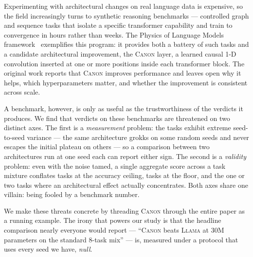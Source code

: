 \documentclass{article}
\newcommand{\Canon}{\textsc{Canon}\xspace}
\newcommand{\Llama}{\textsc{Llama}\xspace}
\begin{document}
Experimenting with architectural changes on real language data is expensive, so the field
increasingly turns to synthetic reasoning benchmarks --- controlled graph and sequence tasks
that isolate a specific transformer capability and train to convergence in hours rather than
weeks. The Physics of Language Models framework~\cite{allen_zhu_physics4} exemplifies this
program: it provides both a battery of such tasks and a candidate architectural improvement,
the \Canon layer, a learned causal 1-D convolution inserted at one or more positions inside
each transformer block. The original work reports that \Canon improves performance and leaves
open why it helps, which hyperparameters matter, and whether the improvement is consistent
across scale.

A benchmark, however, is only as useful as the trustworthiness of the verdicts it produces.
We find that verdicts on these benchmarks are threatened on two distinct axes. The first is a
\emph{measurement} problem: the tasks exhibit extreme seed-to-seed variance --- the same
architecture grokks on some random seeds and never escapes the initial plateau on others ---
so a comparison between two architectures run at one seed each can report either sign. The
second is a \emph{validity} problem: even with the noise tamed, a single aggregate score across
a task mixture conflates tasks at the accuracy ceiling, tasks at the floor, and the one or two
tasks where an architectural effect actually concentrates. Both axes share one villain: being
fooled by a benchmark number.

We make these threats concrete by threading \Canon through the entire paper as a running
example. The irony that powers our study is that the headline comparison nearly everyone would
report --- ``\Canon beats \Llama at 30M parameters on the standard 8-task mix'' --- is, measured
under a protocol that uses every seed we have, \emph{null}.
\end{document}
